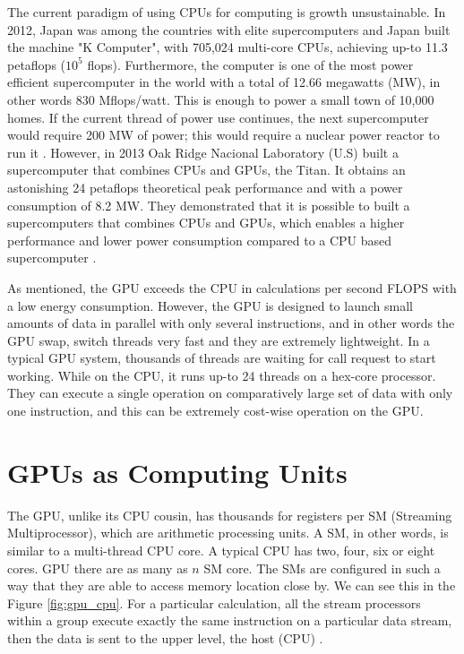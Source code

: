 The current paradigm of using CPUs for computing is growth unsustainable. In 2012, Japan was among the countries with elite supercomputers and Japan built the machine "K Computer", with 705,024 multi-core CPUs, achieving up-to 11.3 petaflops ($10^5$ flops). Furthermore, the computer is one of the most power efficient supercomputer in the world with a total of 12.66 megawatts (MW), in other words 830 Mflops/watt. This is enough to power a small town of 10,000 homes. If the current thread of power use continues, the next supercomputer would require 200 MW of power; this would require a nuclear power reactor to run it \cite{whatexascale}. However, in 2013 Oak Ridge Nacional Laboratory (U.S) built a supercomputer that combines CPUs and GPUs, the Titan. It obtains an astonishing 24 petaflops theoretical peak performance and with a power consumption of 8.2 MW. They demonstrated that it is possible to built a supercomputers that combines CPUs and GPUs, which enables a  higher performance and lower power consumption compared to a CPU based supercomputer \cite{titan}.

As mentioned, the GPU exceeds the CPU in calculations per second FLOPS with a low energy consumption. However, the GPU is designed to launch small amounts of data in parallel with only several instructions, and in other words the GPU swap, switch threads very fast and they are extremely lightweight. In a typical GPU system, thousands of threads are waiting for call request to start working. While on the CPU, it runs up-to 24 threads on a hex-core processor. They can execute a single operation on comparatively large set of data with only one instruction, and this can be extremely cost-wise operation on the GPU.

\section{GPUs as Computing Units}


The GPU, unlike its CPU cousin, has thousands for registers per SM (Streaming Multiprocessor), which are arithmetic processing units. A SM, in other words, is similar to a multi-thread CPU core.  A typical CPU has two, four, six or eight cores. GPU there are as many as $n$ SM core. The SMs are configured in such a way that they are able to access memory location close by. We can see this in the Figure \ref{fig:gpu_cpu}. For a particular calculation, all the stream processors within a group execute exactly the same instruction on a particular data stream, then the data is sent to the upper level, the host (CPU) \cite{cook}.

